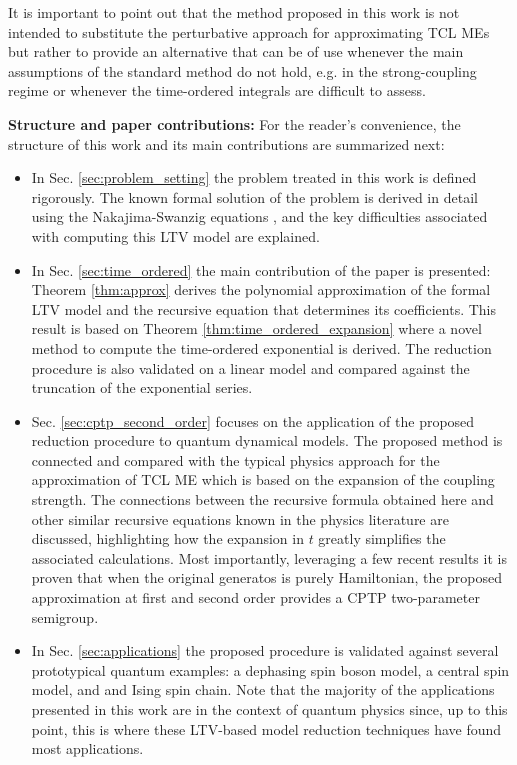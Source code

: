 \documentclass[10pt,aps,pra,twocolumn,showpacs,superscriptaddress,nobalancelastpage,notitlepage,nofootinbib,longbibliography]{revtex4-2}
\begin{document}
It is important to point out that the method proposed in this work is not intended to substitute the perturbative approach for approximating TCL MEs \cite{shibata_generalized_1977,chaturvedi_time-convolutionless_1979} but rather to provide an alternative that can be of use whenever the main assumptions of the standard method do not hold, e.g. in the strong-coupling regime or whenever the time-ordered integrals are difficult to assess. 

\textbf{Structure and paper contributions:} For the reader's convenience, the structure of this work and its main contributions are summarized next:  
\begin{itemize}
    \item In Sec. \ref{sec:problem_setting} the problem treated in this work is defined rigorously. The known formal solution of the problem is derived in detail using the Nakajima-Swanzig equations \cite{nakajima,zwanzig},  and the key difficulties associated with computing this LTV model are explained.  
    \item In Sec. \ref{sec:time_ordered} the main contribution of the paper is presented: Theorem \ref{thm:approx} derives the polynomial approximation of the formal LTV model and the recursive equation that determines its coefficients. This result is based on Theorem \ref{thm:time_ordered_expansion} where a novel method to compute the time-ordered exponential is derived. The reduction procedure is also validated on a linear model and compared against the truncation of the exponential series. 
    \item Sec. \ref{sec:cptp_second_order} focuses on the application of the proposed reduction procedure to quantum dynamical models. The proposed method is connected and compared with the typical physics approach for the approximation of TCL ME which is based on the expansion of the coupling strength. The connections between the recursive formula obtained here and other similar recursive equations known in the physics literature \cite{nestmann2019time,cerrillo2014non,cygorek2025timenonlocalversustimelocallongtime,gasbarri2018recursive} are discussed, highlighting how the expansion in $t$ greatly simplifies the associated calculations. Most importantly, leveraging a few recent results \cite{grigoletto2024exact,grigoletto2025quantummodelreductioncontinuoustime} it is proven that when the original generatos is purely Hamiltonian, the proposed approximation at first and second order provides a CPTP two-parameter semigroup.
    \item In Sec. \ref{sec:applications} the proposed procedure is validated against several prototypical quantum examples: a dephasing spin boson model, a central spin model, and and Ising spin chain. Note that the majority of the applications presented in this work are in the context of quantum physics since, up to this point, this is where these LTV-based model reduction techniques have found most applications.  
\end{itemize}
\end{document}
